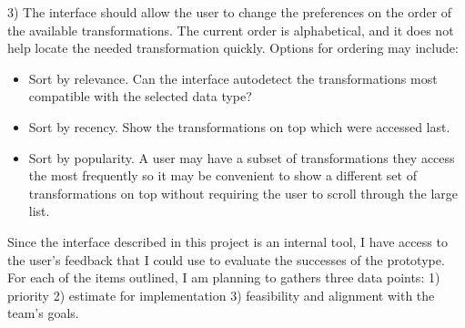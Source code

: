 \documentclass[12pt,letterpaper]{article}
\begin{document}
3) The interface should allow the user to change the preferences on the order of the available transformations. The current order is alphabetical, and it does not help locate the needed transformation quickly. Options for ordering may include: 

\begin{itemize}
    \item Sort by relevance. Can the interface autodetect the transformations most compatible with the selected data type?
    \item Sort by recency. Show the transformations on top which were accessed last.
    \item Sort by popularity. A user may have a subset of transformations they access the most frequently so it may be convenient to show a different set of transformations on top without requiring the user to scroll through the large list. 
\end{itemize}

Since the interface described in this project is an internal tool, I have access to the user's feedback that I could use to evaluate the successes of the prototype. For each of the items outlined, I am planning to gathers three data points: 1) priority 2) estimate for implementation 3) feasibility and alignment with the team's goals.
\end{document}
